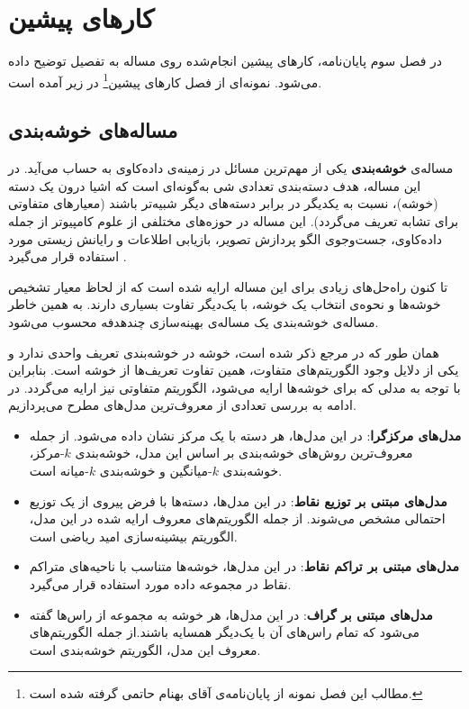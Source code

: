 
\chapter{کارهای پیشین}
در فصل سوم پایان‌نامه، کارهای پیشین انجام‌شده روی مساله به تفصیل توضیح داده می‌شود. نمونه‌ای از فصل کارهای پیشین\footnote{مطالب این فصل نمونه از پایان‌نامه‌ی آقای بهنام حاتمی گرفته شده است.} در زیر آمده است.


\section{مساله‌های خوشه‌بندی}
مساله‌ی \textbf{خوشه‌بندی} یکی از مهم‌ترین مسائل در زمینه‌ی داده‌کاوی به حساب می‌آید. در این مساله، هدف دسته‌بندی تعدادی شی به‌گونه‌ای است که اشیا درون یک دسته (خوشه)، نسبت به یکدیگر در برابر دسته‌های دیگر شبیه‌تر باشند (معیارهای متفاوتی برای تشابه تعریف می‌گردد). این مساله در حوزه‌های مختلفی از علوم کامپیوتر از جمله داده‌کاوی، جست‌وجوی الگو پردازش تصویر، بازیابی اطلاعات و رایانش زیستی مورد استفاده قرار می‌گیرد \cite{han2006}.

تا کنون راه‌حل‌های زیادی برای این مساله ارایه شده است که از لحاظ معیار تشخیص خوشه‌ها و نحوه‌ی انتخاب یک خوشه، با یک‌دیگر تفاوت بسیاری دارند. به همین خاطر مساله‌ی خوشه‌بندی یک مساله‌ی بهینه‌سازی چندهدفه محسوب می‌شود.

همان طور که در مرجع \cite{estivill2002so} ذکر شده است، خوشه در خوشه‌بندی تعریف واحدی ندارد و یکی از دلایل وجود الگوریتم‌های متفاوت، همین تفاوت تعریف‌ها از خوشه است. بنابراین با توجه به مدلی که برای خوشه‌ها ارایه می‌شود، الگوریتم متفاوتی نیز ارایه می‌گردد. در ادامه به بررسی تعدادی از معروف‌ترین مدل‌های مطرح می‌پردازیم.
\begin{itemize}
\item \textbf{مدل‌های مرکزگرا}:
در این مدل‌ها، هر دسته با یک مرکز نشان داده می‌شود. از جمله معروف‌ترین روش‌های خوشه‌بندی بر اساس این مدل،  خوشه‌بندی $k$-مرکز، خوشه‌بندی $k$-میانگین و خوشه‌بندی $k$-میانه است.
\item \textbf{مدل‌های مبتنی بر توزیع نقاط}:
در این مدل‌ها، دسته‌ها با فرض پیروی از یک توزیع احتمالی مشخص می‌شوند. از جمله الگوریتم‌های معروف ارایه شده در این مدل، الگوریتم بیشینه‌سازی امید ریاضی  است.
\item \textbf{مدل‌های مبتنی بر تراکم نقاط}:
در این مدل‌ها، خوشه‌ها متناسب با ناحیه‌های متراکم نقاط در مجموعه داده مورد استفاده قرار می‌گیرد.
\item \textbf{مدل‌های مبتنی بر گراف}:
در این مدل‌ها، هر خوشه به مجموعه از راس‌ها گفته می‌شود که تمام راس‌های آن با یک‌دیگر همسایه باشند.از جمله الگوریتم‌های معروف این مدل، الگوریتم خوشه‌بندی  است.
\end{itemize}

